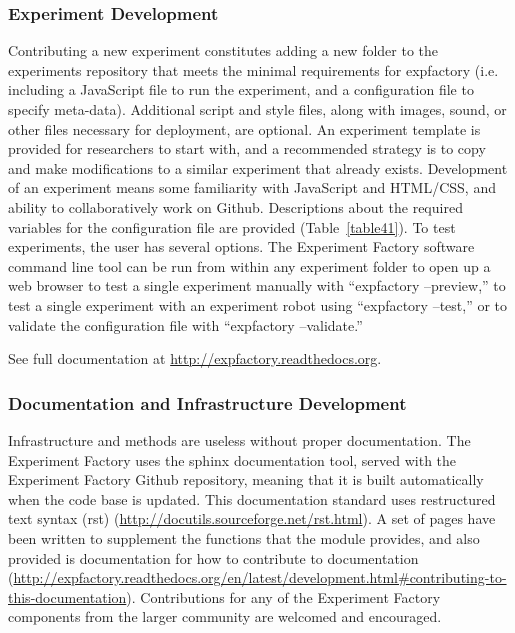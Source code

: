 \documentclass{report}
\begin{document}
\subsubsection{Experiment Development}
Contributing a new experiment constitutes adding a new folder to the
experiments repository that meets the minimal requirements for
expfactory (i.e. including a JavaScript file to run the experiment, and
a configuration file to specify meta-data). Additional script and style
files, along with images, sound, or other files necessary for
deployment, are optional. An experiment template is provided for
researchers to start with, and a recommended strategy is to copy and
make modifications to a similar experiment that already exists.
Development of an experiment means some familiarity with JavaScript and
HTML/CSS, and ability to collaboratively work on Github. Descriptions
about the required variables for the configuration file are provided
(Table~\ref{table41}). To test experiments, the user has several options. The
Experiment Factory software command line tool can be run from within any
experiment folder to open up a web browser to test a single experiment
manually with ``expfactory --preview,'' to test a single experiment with an experiment robot using ``expfactory --test,'' or to validate the configuration file with ``expfactory --validate.''

See full documentation at \href{http://expfactory.readthedocs.org}{http://expfactory.readthedocs.org}.

\subsubsection{Documentation and Infrastructure
Development}

Infrastructure and methods are useless without proper documentation. The
Experiment Factory uses the sphinx documentation tool, served with the
Experiment Factory Github repository, meaning that it is built
automatically when the code base is updated. This documentation standard
uses restructured text syntax (rst)
(\href{http://docutils.sourceforge.net/rst.html}{http://docutils.sourceforge.net/rst.html}). A set of pages have been
written to supplement the functions that the module provides, and also
provided is documentation for how to contribute to documentation (\href{http://expfactory.readthedocs.org/en/latest/development.html\#contributing-to-this-documentation}{http://expfactory.readthedocs.org/en/latest/development.html\#contributing-to-this-documentation}).
Contributions for any of the Experiment Factory components from the
larger community are welcomed and encouraged.
\end{document}
